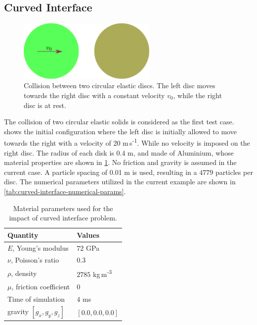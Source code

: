 \subsection{Curved Interface}
\label{sec:results-circular-interface}
\begin{figure}[!htpb]
  \centering
  \includegraphics[width=0.6\textwidth]{images/csph/images/yan_2021_curved_interface/schematic}
  \caption{Collision between two circular elastic discs. The left disc moves
    towards the right disc with a constant velocity $v_0$, while the right
    disc is at rest.}
\label{fig:results-yan-circular-interface-schematic}
\end{figure}
The collision of two circular elastic solids is considered as the first test
case.  shows the initial
configuration where the left disc is initially allowed to move towards the
right with a velocity of 20 m\,s\textsuperscript{-1}. While no velocity is
imposed on the right disc. The radius of each disk is $0.4$ m, and made of
Aluminium, whose material properties are shown in
\cref{tab:curved-interface-material-params}. No friction and gravity is
assumed in the current case. A particle spacing of 0.01 m is used, resulting
in a $4779$ particles per disc. The numerical parameters utilized in
the current example are shown in \cref{tab:curved-interface-numerical-params}.
\begin{table}[!ht]
  \centering
  \begin{tabular}[!ht]{ll}
    \toprule
    Quantity & Values\\
    \midrule
    $E$, Young's modulus & $72$ GPa \\
    $\nu$, Poisson's ratio & $0.3$ \\
    $\rho$, density & $2785$ kg\,m\textsuperscript{-3} \\
    $\mu$, friction coefficient & $0$ \\
    Time of simulation & $4$ ms \\
    gravity $[g_x, g_y, g_z]$ & $[0.0, 0.0, 0.0]$\\
    \bottomrule
  \end{tabular}
  \caption{Material parameters used for the impact of curved interface problem.}%
  \label{tab:curved-interface-material-params}
\end{table}
